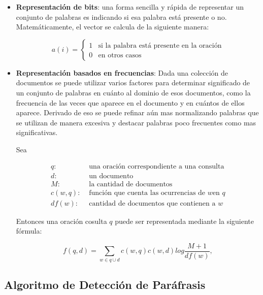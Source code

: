 \begin{itemize}
    \item \textbf{Representación de bits}: una forma sencilla y rápida de representar un conjunto de palabras es indicando si esa palabra está presente o no. Matemáticamente, el vector se calcula de la siguiente manera:
    
    \begin{equation*}
        a(i) = 
        \begin{cases}
            1 & \text{si la palabra está presente en la oración}\\
            0 & \text{en otros casos}
        \end{cases}
    \end{equation*}

    \item \textbf{Representación basados en frecuencias}: Dada una colección de documentos se puede utilizar varios factores para determinar significado de un conjunto de palabras en cuánto al dominio de esos documentos, como la frecuencia de las veces que aparece en el documento y en cuántos de ellos aparece. Derivado de eso se puede refinar aún mas normalizando palabras que se utilizan de manera excesiva y destacar palabras poco frecuentes como mas significativas. 
    
    Sea
    
    \begin{align*} 
        q: & \text{ una oración correspondiente a una consulta}\\
        d: & \text{ un documento}\\
        M: & \text{ la cantidad de documentos}\\
        c(w, q): & \text{ función que cuenta las ocurrencias de } w \text{en } q\\
        df(w): & \text{ cantidad de documentos que contienen a } w
    \end{align*}
    
    Entonces una oración cosulta $q$ puede ser representada mediante la siguiente fórmula:

    $$
    f(q, d) = \sum_{w \in q \cup d} c(w, q) c(w, d) log \frac{M + 1}{df(w)},
    $$
\end{itemize}

\subsection{Algoritmo de Detección de Paráfrasis}
\label{sec:deteccion-parafrasis}

